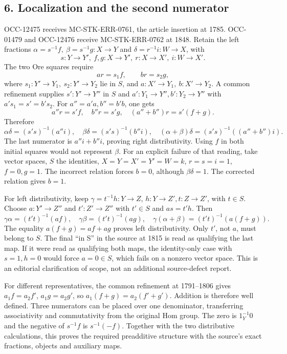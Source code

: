 \documentclass[11pt]{article}
\begin{document}
\subsection{6. Localization and the second numerator}\label{note-01-localization-and-the-second-numerator}

OCC-12475 receives MC-STK-ERR-0761, the article insertion at 1785. OCC-01479 and OCC-12476 receive MC-STK-ERR-0762 at 1848. Retain the left fractions \(\alpha=s^{-1}f,\ \beta=s^{-1}g:X\to Y\) and \(\delta=r^{-1}i:W\to X\), with \[
s:Y\to Y',\ f,g:X\to Y',\
r:X\to X',\ i:W\to X'.
\] The two Ore squares require \[
ar=s_1f,\qquad br=s_2g,
\] where \(s_1:Y'\to Y_1,\ s_2:Y'\to Y_2\) lie in \(S\), and \(a:X'\to Y_1,\ b:X'\to Y_2\). A common refinement supplies \(s':Y'\to Y''\) in \(S\) and \(a':Y_1\to Y'',b':Y_2\to Y''\) with \(a's_1=s'=b's_2\). For \(a''=a'a,b''=b'b\), one gets \[
a''r=s'f,\quad b''r=s'g,\quad (a''+b'')r=s'(f+g).
\] Therefore \[
\alpha\delta=(s's)^{-1}(a''i),\quad
\beta\delta=(s's)^{-1}(b''i),\quad
(\alpha+\beta)\delta=(s's)^{-1}((a''+b'')i).
\] The last numerator is \(a''i+b''i\), proving right distributivity. Using \(f\) in both initial squares would not represent \(\beta\). For an explicit failure of that reading, take vector spaces, \(S\) the identities, \(X=Y=X'=Y'=W=k\), \(r=s=i=1\), \(f=0,g=1\). The incorrect relation forces \(b=0\), although \(\beta\delta=1\). The corrected relation gives \(b=1\).

For left distributivity, keep \(\gamma=t^{-1}h:Y\to Z\), \(h:Y\to Z',t:Z\to Z'\), with \(t\in S\). Choose \(a:Y'\to Z''\) and \(t':Z'\to Z''\) with \(t'\in S\) and \(as=t'h\). Then \[
\gamma\alpha=(t't)^{-1}(af),\quad
\gamma\beta=(t't)^{-1}(ag),\quad
\gamma(\alpha+\beta)=(t't)^{-1}(a(f+g)).
\] The equality \(a(f+g)=af+ag\) proves left distributivity. Only \(t'\), not \(a\), must belong to \(S\). The final ``in S'' in the source at 1815 is read as qualifying the last map. If it were read as qualifying both maps, the identity-only case with \(s=1,h=0\) would force \(a=0\in S\), which fails on a nonzero vector space. This is an editorial clarification of scope, not an additional source-defect report.

For different representatives, the common refinement at 1791--1806 gives \(a_1f=a_2f'\), \(a_1g=a_2g'\), so \(a_1(f+g)=a_2(f'+g')\). Addition is therefore well defined. Three numerators can be placed over one denominator, transferring associativity and commutativity from the original Hom group. The zero is \(1_Y^{-1}0\) and the negative of \(s^{-1}f\) is \(s^{-1}(-f)\). Together with the two distributive calculations, this proves the required preadditive structure with the source's exact fractions, objects and auxiliary maps.
\clearpage
\end{document}
